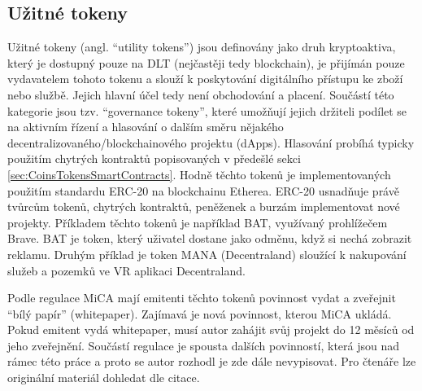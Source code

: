 \subsection{Užitné tokeny}
Užitné tokeny (angl. \enquote{utility tokens}) jsou definovány jako druh kryptoaktiva, který je dostupný pouze na DLT (nejčastěji tedy blockchain), je přijímán pouze vydavatelem tohoto
tokenu a slouží k poskytování digitálního přístupu ke zboží nebo službě. Jejich hlavní účel tedy není obchodování a placení. Součástí této kategorie jsou tzv. \enquote{governance tokeny},
které umožňují jejich držiteli podílet se na aktivním řízení a hlasování o dalším směru nějakého decentralizovaného/blockchainového projektu (dApps). Hlasování probíhá typicky
použitím chytrých kontraktů popisovaných v předešlé sekci \ref{sec:CoinsTokensSmartContracts}. Hodně těchto tokenů je implementovaných použitím standardu ERC-20 na blockchainu Etherea.
ERC-20 usnadňuje právě tvůrcům tokenů, chytrých kontraktů, peněženek a burzám implementovat nové projekty. Příkladem těchto tokenů je například BAT, využívaný prohlížečem Brave.
BAT je token, který uživatel dostane jako odměnu, když si nechá zobrazit reklamu. Druhým příklad je token MANA (Decentraland) sloužící k nakupování služeb a pozemků ve VR aplikaci
Decentraland.

Podle regulace MiCA mají emitenti těchto tokenů povinnost vydat a zveřejnit \enquote{bílý papír} (whitepaper). Zajímavá je nová povinnost,
kterou MiCA ukládá. Pokud emitent vydá whitepaper, musí autor zahájit svůj projekt do 12 měsíců od jeho zveřejnění. Součástí regulace je spousta dalších povinností, která jsou nad rámec
této práce a proto se autor rozhodl je zde dále nevypisovat. Pro čtenáře lze originální materiál dohledat dle citace.

